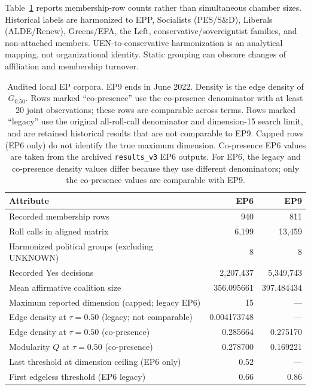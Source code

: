 \documentclass[a4paper,fleqn,oneside]{cas-sc}
\theoremstyle{definition}
\theoremstyle{plain}
\begin{document}
Table~\ref{tab:ep_summary} reports membership-row counts rather than simultaneous chamber sizes. Historical labels are harmonized to EPP, Socialists (PES/S\&D), Liberals (ALDE/Renew), Greens/EFA, the Left, conservative/sovereigntist families, and non-attached members. UEN-to-conservative harmonization is an analytical mapping, not organizational identity. Static grouping can obscure changes of affiliation and membership turnover.
\begin{table}[pos=t]\centering\small
\caption{Audited local EP corpora. EP9 ends in June 2022. Density is the edge density of $G_{0.50}$. Rows marked ``co-presence'' use the co-presence denominator with at least 20 joint observations; these rows are comparable across terms. Rows marked ``legacy'' use the original all-roll-call denominator and dimension-15 search limit, and are retained historical results that are not comparable to EP9. Capped rows (EP6 only) do not identify the true maximum dimension. Co-presence EP6 values are taken from the archived \texttt{results\_v3} EP6 outputs. For EP6, the legacy and co-presence density values differ because they use different denominators; only the co-presence values are comparable with EP9.}

\label{tab:ep_summary}
\begin{tabular}{lrr}\toprule
Attribute & EP6 & EP9\\\midrule
Recorded membership rows & 940 & 811\\
Roll calls in aligned matrix & 6,199 & 13,459\\
Harmonized political groups (excluding UNKNOWN) & 8 & 8\\
Recorded Yes decisions & 2,207,437 & 5,349,743\\
Mean affirmative coalition size & 356.095661 & 397.484434\\
Maximum reported dimension (capped; legacy EP6) & 15 & ---\\
Edge density at $\tau=0.50$ (legacy; not comparable) & 0.004173748 & ---\\
Edge density at $\tau=0.50$ (co-presence) & 0.285664 & 0.275170\\
Modularity $Q$ at $\tau=0.50$ (co-presence) & 0.278700 & 0.169221\\
Last threshold at dimension ceiling (EP6 only) & 0.52 & ---\\
First edgeless threshold (EP6 legacy) & 0.66 & 0.86\\\bottomrule
\end{tabular}
\end{table}
\end{document}
